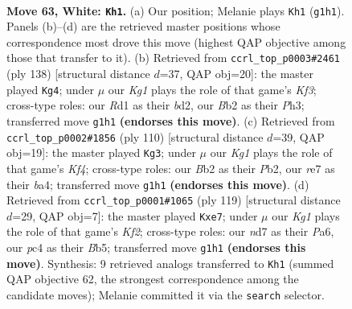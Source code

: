\documentclass[11pt]{article}
\begin{document}
\clearpage

\begin{figure}[p]\centering
\begin{subfigure}{0.46\textwidth}\centering
\resizebox{\linewidth}{!}{%
\newchessgame
\chessboard[
  setfen={7k/3nr3/6P1/8/p1p5/P1P4p/1BP4P/3R2K1 w - - 15 63},
  showmover=false,
  pgfstyle=straightmove, color=movearrow, markmove={g1-h1}
]}
\caption{}
\end{subfigure}\hfill
\begin{subfigure}{0.46\textwidth}\centering
\resizebox{\linewidth}{!}{%
\newchessgame
\chessboard[
  setfen={8/5k2/3p3p/2pP1P2/2B2P2/1P3K1P/3b4/8 w - - 17 70},
  showmover=false,
  pgfstyle=straightmove, color=movearrow, markmove={f3-g4}
]}
\caption{}
\end{subfigure}
\\[4pt]
\begin{subfigure}{0.46\textwidth}\centering
\resizebox{\linewidth}{!}{%
\newchessgame
\chessboard[
  setfen={3B4/1p5p/4kpp1/P1p5/b4KPP/5P2/1P6/8 w - - 29 56},
  showmover=false,
  pgfstyle=straightmove, color=movearrow, markmove={f4-g3}
]}
\caption{}
\end{subfigure}\hfill
\begin{subfigure}{0.46\textwidth}\centering
\resizebox{\linewidth}{!}{%
\newchessgame
\chessboard[
  setfen={8/4Pk1p/pr6/1bp2P1p/2p5/2P2NK1/R7/8 b - - 0 60},
  showmover=false,
  pgfstyle=straightmove, color=movearrow, markmove={f7-e7}
]}
\caption{}
\end{subfigure}
\caption{\textbf{Move 63, White: \texttt{Kh1}.} (a) Our position; Melanie plays \texttt{Kh1} (\texttt{g1h1}). Panels (b)--(d) are the retrieved master positions whose correspondence most drove this move (highest QAP objective among those that transfer to it). (b) Retrieved from \texttt{ccrl\_top\_p0003\#2461} (ply 138) [structural distance $d$=37, QAP obj=20]: the master played \texttt{Kg4}; under $\mu$ our \emph{Kg1} plays the role of that game's \emph{Kf3}; cross-type roles: our \emph{R}d1 as their \emph{b}d2, our \emph{B}b2 as their \emph{P}h3; transferred move \texttt{g1h1} \textbf{(endorses this move)}. (c) Retrieved from \texttt{ccrl\_top\_p0002\#1856} (ply 110) [structural distance $d$=39, QAP obj=19]: the master played \texttt{Kg3}; under $\mu$ our \emph{Kg1} plays the role of that game's \emph{Kf4}; cross-type roles: our \emph{B}b2 as their \emph{P}b2, our \emph{r}e7 as their \emph{b}a4; transferred move \texttt{g1h1} \textbf{(endorses this move)}. (d) Retrieved from \texttt{ccrl\_top\_p0001\#1065} (ply 119) [structural distance $d$=29, QAP obj=7]: the master played \texttt{Kxe7}; under $\mu$ our \emph{Kg1} plays the role of that game's \emph{Kf2}; cross-type roles: our \emph{n}d7 as their \emph{P}a6, our \emph{p}c4 as their \emph{B}b5; transferred move \texttt{g1h1} \textbf{(endorses this move)}. Synthesis: 9 retrieved analogs transferred to \texttt{Kh1} (summed QAP objective 62, the strongest correspondence among the candidate moves); Melanie committed it via the \texttt{search} selector.}
\label{fig:thought-m124}
\end{figure}
\end{document}
